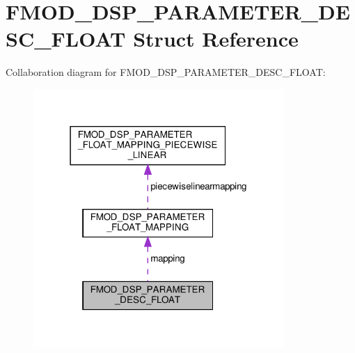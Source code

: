 \hypertarget{structFMOD__DSP__PARAMETER__DESC__FLOAT}{}\section{F\+M\+O\+D\+\_\+\+D\+S\+P\+\_\+\+P\+A\+R\+A\+M\+E\+T\+E\+R\+\_\+\+D\+E\+S\+C\+\_\+\+F\+L\+O\+AT Struct Reference}
\label{structFMOD__DSP__PARAMETER__DESC__FLOAT}


Collaboration diagram for F\+M\+O\+D\+\_\+\+D\+S\+P\+\_\+\+P\+A\+R\+A\+M\+E\+T\+E\+R\+\_\+\+D\+E\+S\+C\+\_\+\+F\+L\+O\+AT\+:
\nopagebreak
\begin{figure}[H]
\begin{center}
\leavevmode
\includegraphics[width=271pt]{structFMOD__DSP__PARAMETER__DESC__FLOAT__coll__graph}
\end{center}
\end{figure}

